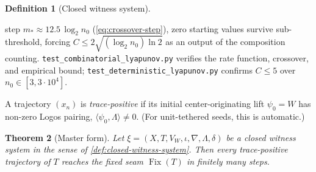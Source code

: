 \documentclass[11pt,a4paper]{article}
\theoremstyle{plain}
\newtheorem{theorem}{Theorem}[section]
\theoremstyle{definition}
\newtheorem{definition}[theorem]{Definition}
\theoremstyle{remark}
\numberwithin{equation}{section}
\DeclareMathOperator{\Fix}{Fix}
\begin{document}
\begin{definition}[Closed witness system]
\begin{enumerate}
        step $m_*\approx 12.5\,\log_2 n_0$
        (\cref{eq:crossover-step}), zero starting values survive
        sub-threshold, forcing $C\le 2\sqrt{(\log_2 n_0)\ln 2}$
        as an output of the composition counting.
        \texttt{test\_combinatorial\_lyapunov.py} verifies the rate
        function, crossover, and empirical bound;
        \texttt{test\_deterministic\_lyapunov.py} confirms $C\le 5$
        over $n_0\in[3,3\cdot 10^4]$.
\end{enumerate}
A trajectory $(x_n)$ is \emph{trace-positive} if its initial
center-originating lift $\psi_0=W$ has non-zero Logos pairing,
$\langle\psi_0,\Lambda\rangle\ne 0$.  (For unit-tethered seeds,
this is automatic.)
\end{definition}

\medskip

\begin{keyresultbox}
\begin{theorem}[Master form]
\label{thm:witness-return-master}
Let $\xi=(X,T,V_W,\iota,\nabla,\Lambda,\delta)$ be a closed
witness system in the sense of
\cref{def:closed-witness-system}.  Then every trace-positive
trajectory of $T$ reaches the fixed seam $\Fix(T)$ in finitely
many steps.
\end{theorem}
\end{keyresultbox}
\end{document}
